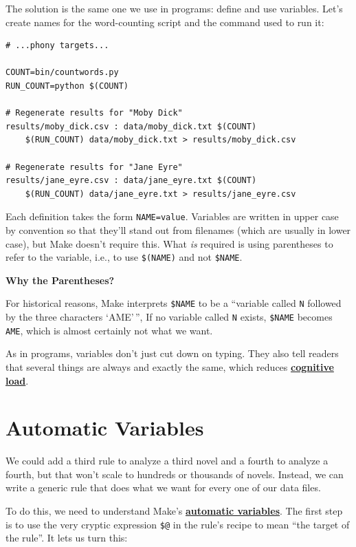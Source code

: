 \documentclass[
]{krantz}
\renewenvironment{quote}{\begin{VF}}{\end{VF}}
\newcommand{\gref}[2]{\hyperlink{#2}{\textbf{#1}}}
\begin{document}
The solution is the same one we use in programs:
define and use variables.
Let's create names for the word-counting script and the command used to run it:

\begin{verbatim}
# ...phony targets...

COUNT=bin/countwords.py
RUN_COUNT=python $(COUNT)

# Regenerate results for "Moby Dick"
results/moby_dick.csv : data/moby_dick.txt $(COUNT)
    $(RUN_COUNT) data/moby_dick.txt > results/moby_dick.csv

# Regenerate results for "Jane Eyre"
results/jane_eyre.csv : data/jane_eyre.txt $(COUNT)
    $(RUN_COUNT) data/jane_eyre.txt > results/jane_eyre.csv
\end{verbatim}

Each definition takes the form \texttt{NAME=value}.
Variables are written in upper case by convention
so that they'll stand out from filenames
(which are usually in lower case),
but Make doesn't require this.
What \emph{is} required is using parentheses to refer to the variable,
i.e.,
to use \texttt{\$(NAME)} and not \texttt{\$NAME}.

\begin{quote}
\textbf{Why the Parentheses?}

For historical reasons,
Make interprets \texttt{\$NAME} to be a ``variable called \texttt{N} followed by the three characters `AME'\,'',
If no variable called \texttt{N} exists,
\texttt{\$NAME} becomes \texttt{AME},
which is almost certainly not what we want.
\end{quote}

As in programs,
variables don't just cut down on typing.
They also tell readers that several things are always and exactly the same,
which reduces \gref{cognitive load}{cognitive\_load}.

\hypertarget{automate-autovar}{%
\section{Automatic Variables}\label{automate-autovar}}

We could add a third rule to analyze a third novel and a fourth to analyze a fourth,
but that won't scale to hundreds or thousands of novels.
Instead,
we can write a generic rule that does what we want for every one of our data files.

To do this,
we need to understand Make's
\gref{automatic variables}{automatic\_variable}.
The first step is to use the very cryptic expression \texttt{\$@} in the rule's recipe
to mean ``the target of the rule''.
It lets us turn this:
\end{document}
